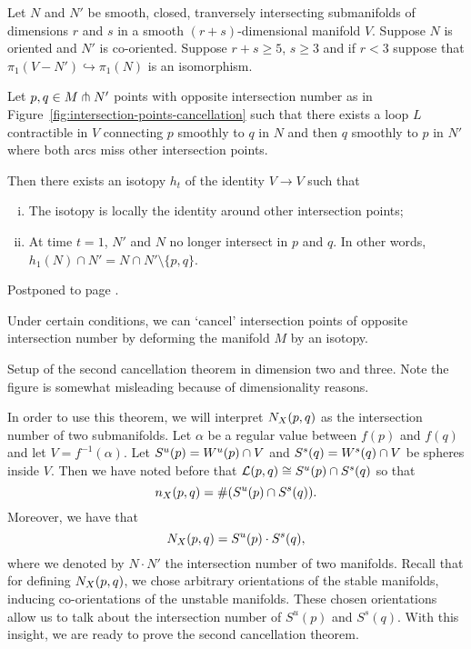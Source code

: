 \begin{theorem}[Whitney]
    Let $N$ and  $N'$ be smooth, closed, tranversely intersecting submanifolds of dimensions  $r$ and $s$ in a smooth  $(r+s)$-dimensional manifold $V$.
    Suppose  $N$ is oriented and  $N'$ is co-oriented.
    Suppose $r+s \ge 5$, $s\ge 3$ and if $r<3$ suppose that $\pi_1(V - N') \hookrightarrow \pi_1(N)$ is an isomorphism.

    Let $p, q \in  M \pitchfork N'$ points with opposite intersection number as in Figure~\ref{fig:intersection-points-cancellation} such that there exists a loop $L$ contractible in  $V$ connecting  $p$ smoothly to $q$ in  $N$  and then $q$ smoothly to  $p$ in $N'$ where both arcs miss other intersection points.

    Then there exists an isotopy $h_t$ of the identity $V \to V$ such that
    \begin{enumerate}[(i)]
        \item The isotopy is locally the identity around other intersection points;
        \item At time  $t = 1$,  $N'$ and  $N$ no longer intersect in $p$ and $q$.  In other words, $h_1(N) \cap N' = N \cap  N' \setminus \{ p, q\} $.
    \end{enumerate}
\end{theorem}
\begin{myproof}
    Postponed to page \pageref{proof:whitney}.
\end{myproof}
\begin{marginfigure}[-6.5cm]
    \centering
    \caption{
    Under certain conditions, we can `cancel' intersection points of opposite intersection number by deforming the manifold $M$ by an isotopy.}
    \label{fig:intersection-points-cancellation}
\end{marginfigure}

\begin{marginfigure}
    \centering
    \caption{Setup of the second cancellation theorem in dimension two and three. Note the figure is somewhat misleading because of dimensionality reasons.}
    \label{fig:second-cancellation-theorem-setup}
\end{marginfigure}
In order to use this theorem, we will interpret $N_{X}(p, q)$ as the intersection number of two submanifolds.
Let $\alpha$ be a regular value between  $f(p)$ and  $f(q)$ and let $V = f^{-1}(\alpha)$.
Let $S^{u}(p) = W^u(p) \cap V$ and 
$S^{s}(q) = W^s(q) \cap V$ be spheres inside $V$.
Then we have noted before that $\mathcal L(p, q) \cong S^{u}(p) \cap S^{s}(q)$ so that \[
    n_{X}(p, q) = \# (S^{u}(p) \cap S^{s}(q)).
\]
Moreover, we have that
\[
    N_{X}(p, q) = S^{u}(p) \cdot S^{s}(q)
,\] 
where we denoted by $N \cdot N'$ the intersection number of two manifolds.
Recall that for defining $N_{X}(p, q)$,
we chose arbitrary orientations of the stable manifolds, inducing co-orientations of the unstable manifolds.
These chosen orientations allow us to talk about the intersection number of $S^{u}(p)$ and $S^{s}(q)$.
With this insight, we are ready to prove the second cancellation theorem.

